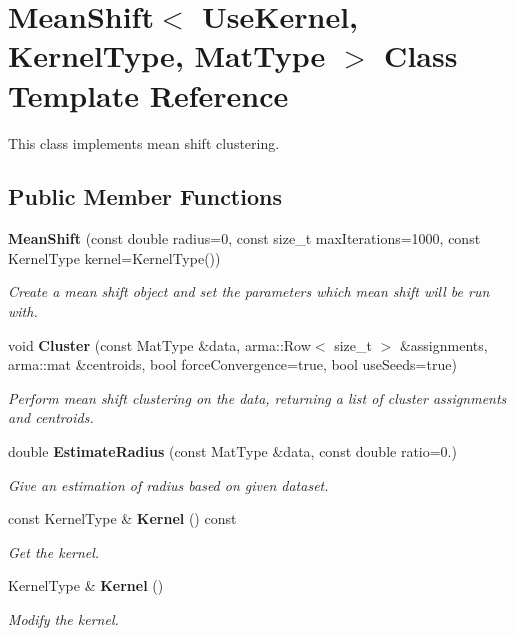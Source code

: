 \section{Mean\+Shift$<$ Use\+Kernel, Kernel\+Type, Mat\+Type $>$ Class Template Reference}
\label{classmlpack_1_1meanshift_1_1MeanShift}


This class implements mean shift clustering.  


\subsection*{Public Member Functions}
\begin{DoxyCompactItemize}
\item 
\textbf{ Mean\+Shift} (const double radius=0, const size\+\_\+t max\+Iterations=1000, const Kernel\+Type kernel=Kernel\+Type())
\begin{DoxyCompactList}\small\item\em Create a mean shift object and set the parameters which mean shift will be run with. \end{DoxyCompactList}\item 
void \textbf{ Cluster} (const Mat\+Type \&data, arma\+::\+Row$<$ size\+\_\+t $>$ \&assignments, arma\+::mat \&centroids, bool force\+Convergence=true, bool use\+Seeds=true)
\begin{DoxyCompactList}\small\item\em Perform mean shift clustering on the data, returning a list of cluster assignments and centroids. \end{DoxyCompactList}\item 
double \textbf{ Estimate\+Radius} (const Mat\+Type \&data, const double ratio=0.)
\begin{DoxyCompactList}\small\item\em Give an estimation of radius based on given dataset. \end{DoxyCompactList}\item 
const Kernel\+Type \& \textbf{ Kernel} () const
\begin{DoxyCompactList}\small\item\em Get the kernel. \end{DoxyCompactList}\item 
Kernel\+Type \& \textbf{ Kernel} ()
\begin{DoxyCompactList}\small\item\em Modify the kernel. \end{DoxyCompactList}\item 

\end{DoxyCompactItemize}

